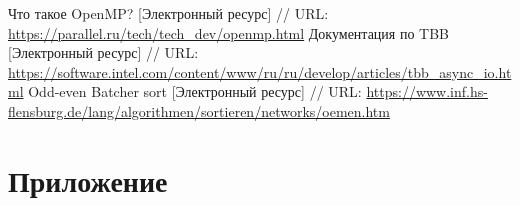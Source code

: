 \documentclass{report}
\begin{document}
\begin{thebibliography}{1}
Что такое OpenMP? [Электронный ресурс] // URL: \url { https://parallel.ru/tech/tech_dev/openmp.html}
Документация по TBB [Электронный ресурс] // URL: \url {https://software.intel.com/content/www/ru/ru/develop/articles/tbb_async_io.html} 
Odd-even Batcher sort [Электронный ресурс] // URL: \url {https://www.inf.hs-flensburg.de/lang/algorithmen/sortieren/networks/oemen.htm}
\end{thebibliography}

\newpage
\section*{Приложение}
\end{document}
